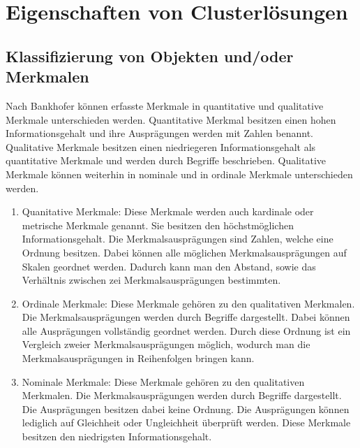 \chapter{Eigenschaften von Clusterlösungen}

\section{Klassifizierung von Objekten und/oder Merkmalen}
Nach Bankhofer \cite{Bankhofer.2008} können erfasste Merkmale in quantitative und qualitative Merkmale unterschieden werden.
Quantitative Merkmal besitzen einen hohen Informationsgehalt und ihre Ausprägungen werden mit Zahlen benannt. Qualitative Merkmale besitzen einen niedriegeren Informationsgehalt als quantitative Merkmale und werden durch Begriffe beschrieben. Qualitative Merkmale können weiterhin in nominale und in ordinale Merkmale unterschieden werden.

\begin{enumerate}
        \item Quanitative Merkmale: Diese Merkmale werden auch kardinale oder metrische Merkmale genannt. Sie besitzen den höchstmöglichen Informationsgehalt. Die Merkmalsausprägungen sind Zahlen, welche eine Ordnung besitzen. Dabei können alle möglichen Merkmalsausprägungen auf Skalen geordnet werden. Dadurch kann man den Abstand, sowie das Verhältnis zwischen zei Merkmalsausprägungen bestimmten.
        \item Ordinale Merkmale: Diese Merkmale gehören zu den qualitativen Merkmalen. Die Merkmalsausprägungen werden durch Begriffe dargestellt. Dabei können alle Ausprägungen vollständig geordnet werden. Durch diese Ordnung ist ein Vergleich zweier Merkmalsausprägungen möglich, wodurch man die Merkmalsausprägungen in Reihenfolgen bringen kann.
        \item Nominale Merkmale: Diese Merkmale gehören zu den qualitativen Merkmalen. Die Merkmalsausprägungen werden durch Begriffe dargestellt. Die Ausprägungen besitzen dabei keine Ordnung. Die Ausprägungen können lediglich auf Gleichheit oder Ungleichheit überprüft werden. Diese Merkmale besitzen den niedrigsten Informationsgehalt.
\end{enumerate}

